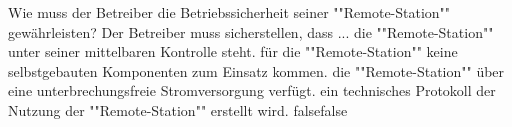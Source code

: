     {Wie muss der Betreiber die Betriebssicherheit seiner ""Remote-Station"" gewährleisten? Der Betreiber muss sicherstellen, dass ...}
    {die ""Remote-Station"" unter seiner mittelbaren Kontrolle steht.}
    {für die ""Remote-Station"" keine selbstgebauten Komponenten zum Einsatz kommen.}
    {die ""Remote-Station"" über eine unterbrechungsfreie Stromversorgung verfügt.}
    {ein technisches Protokoll der Nutzung der ""Remote-Station"" erstellt wird.}
    {false}{false}